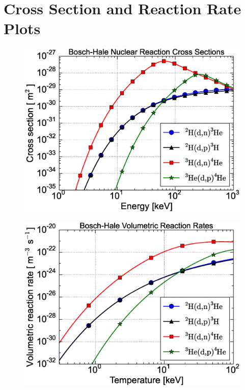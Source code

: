 \vfill

\pagebreak
{}
\section{Cross Section and Reaction Rate Plots}
\noindent
\begin{figure}[ht!]
  \centering
  \includegraphics[width=0.95\columnwidth]{figures/BH_CrossSections.eps}
\end{figure}

\noindent
\begin{figure}[hb!]
  \centering
  \includegraphics[width=0.95\columnwidth]{figures/BH_ReactionRates.eps}
\end{figure}

\vfill
